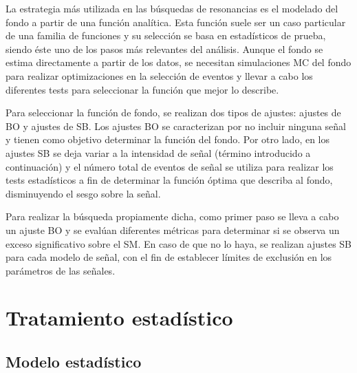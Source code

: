 La estrategia más utilizada en las búsquedas de resonancias es el modelado del fondo a partir de una función analítica. Esta función suele ser un caso particular de una familia de funciones y su selección se basa en estadísticos de prueba, siendo éste uno de los pasos más relevantes del análisis.
Aunque el fondo se estima directamente a partir de los datos, se necesitan simulaciones \ac{MC} del fondo para realizar optimizaciones en la selección de eventos y llevar a cabo los diferentes tests para seleccionar la función que mejor lo describe.

Para seleccionar la función de fondo, se realizan dos tipos de ajustes: ajustes de \acf{BO} y ajustes de \acf{SB}. Los ajustes \ac{BO} se caracterizan por no incluir ninguna señal y tienen como objetivo determinar la función del fondo.
Por otro lado, en los ajustes \ac{SB} se deja variar a la intensidad de señal (término introducido a continuación) y el número total de eventos de señal se utiliza para realizar los tests estadísticos a fin de determinar la función óptima que describa al fondo, disminuyendo el sesgo sobre la señal.

Para realizar la búsqueda propiamente dicha, como primer paso se lleva a cabo un ajuste \ac{BO} y se evalúan diferentes métricas para determinar si se observa un exceso significativo sobre el \ac{SM}. En caso de que no lo haya, se realizan ajustes \ac{SB} para cada modelo de señal, con el fin de establecer límites de exclusión en los parámetros de las señales.






\section{Tratamiento estadístico}
\label{sec:strategy:stat_treatment}




\subsection{Modelo estadístico}
\label{subsec:strategy:stat_treatment:stat_model}

